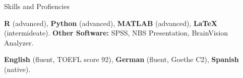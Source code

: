 \begin{rubric}{Skills and Profiencies}


\entry*[Programming:] 
\textbf{R} (advanced), \textbf{Python} (advanced), \textbf{MATLAB} (advanced), \textbf{LaTeX} (intermideate).
\newline \textbf{Other Software:} SPSS, NBS Presentation, BrainVision Analyzer.

\entry*[Language:] 
\textbf{English} (fluent, TOEFL score 92), \textbf{German} (fluent, Goethe C2), \textbf{Spanish} (native).

\end{rubric}

